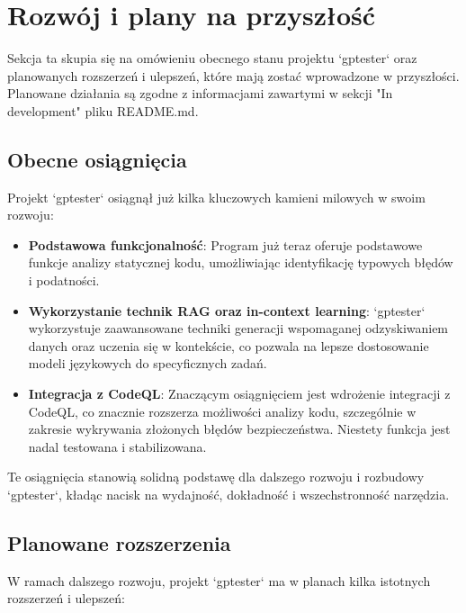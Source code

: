 \section{Rozwój i plany na przyszłość}
\label{sec:rozwoj_i_plany_na_przyszlosc}

Sekcja ta skupia się na omówieniu obecnego stanu projektu `gptester` oraz planowanych rozszerzeń i ulepszeń, które mają zostać wprowadzone w przyszłości. Planowane działania są zgodne z informacjami zawartymi w sekcji "In development" pliku README.md.

\subsection{Obecne osiągnięcia}
\label{subsec:obecne_osiagniecia}

Projekt `gptester` osiągnął już kilka kluczowych kamieni milowych w swoim rozwoju:

\begin{itemize}
    \item \textbf{Podstawowa funkcjonalność}: Program już teraz oferuje podstawowe funkcje analizy statycznej kodu, umożliwiając identyfikację typowych błędów i podatności.
    \item \textbf{Wykorzystanie technik RAG oraz in-context learning}: `gptester` wykorzystuje zaawansowane techniki generacji wspomaganej odzyskiwaniem danych oraz uczenia się w kontekście, co pozwala na lepsze dostosowanie modeli językowych do specyficznych zadań.
    \item \textbf{Integracja z CodeQL}: Znaczącym osiągnięciem jest wdrożenie integracji z CodeQL, co znacznie rozszerza możliwości analizy kodu, szczególnie w zakresie wykrywania złożonych błędów bezpieczeństwa. Niestety funkcja jest nadal testowana i stabilizowana.
\end{itemize}

Te osiągnięcia stanowią solidną podstawę dla dalszego rozwoju i rozbudowy `gptester`, kładąc nacisk na wydajność, dokładność i wszechstronność narzędzia.

\subsection{Planowane rozszerzenia}
\label{subsec:planowane_rozszerzenia}

W ramach dalszego rozwoju, projekt `gptester` ma w planach kilka istotnych rozszerzeń i ulepszeń:


